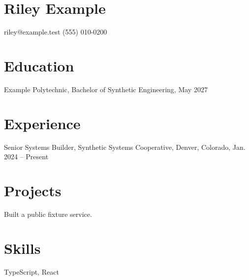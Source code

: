 \documentclass{article}
\begin{document}
\section*{Riley Example}
riley@example.test \quad (555) 010-0200
\section*{Education}
Example Polytechnic, Bachelor of Synthetic Engineering, May 2027
\section*{Experience}
Senior Systems Builder, Synthetic Systems Cooperative, Denver, Colorado, Jan. 2024 -- Present
\section*{Projects}
Built a public fixture service.
\section*{Skills}
TypeScript, React
\end{document}
